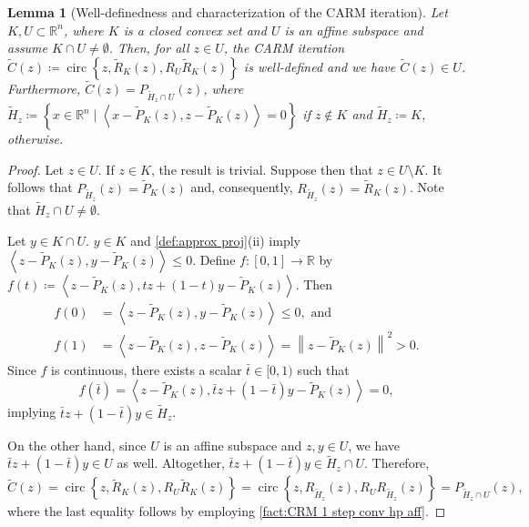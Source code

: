 \documentclass[smallextended,numbook,nospthms]{svjour3}
\theoremstyle{plain}
\newtheorem{lemma}[theorem]{Lemma}
\theoremstyle{definition}
\def\RR{\mathds R}
\newcommand{\scal}[2]{\left\langle{#1},{#2}  \right\rangle}
\DeclareMathOperator{\circum}{circ}
\begin{document}
\begin{lemma}[Well-definedness and characterization of the CARM iteration] \label{lem:CARM well-def char} 
	Let $K, U \subset \RR^{n}$, where $K$ is a closed convex set and $U$ is an affine subspace and assume $K \cap U \not = \emptyset$. Then, for all $z \in U$, the CARM iteration $\tilde{C}(z)\coloneqq \circum\left\{z, \tilde{R}_{K}(z), R_{U}\tilde{R}_{K}(z)\right\}$ is well-defined and we have $\tilde{C}(z) \in U$. Furthermore, $\tilde{C}(z)=P_{\tilde{H}_{z} \cap U}(z)$,
	where $\tilde{H}_{z}\coloneqq \left\{x \in \RR^{n} \mid \scal{x-\tilde{P}_{K}(z)}{z-\tilde{P}_{K}(z)}=0\right\}$ if $z \notin K$ and $\tilde{H}_{z}\coloneqq K$, otherwise.
\end{lemma}
	\begin{proof}

	Let $z \in U$.
	If $z \in K$, the result is trivial. Suppose then that $z \in U \setminus K$. It follows that $P_{\tilde{H}_{z}}(z)=\tilde{P}_{K}(z)$ and, consequently, $R_{\tilde{H}_{z}}(z)=\tilde{R}_{K}(z)$.
	Note that $\tilde{H}_{z} \cap U \neq \emptyset$.
	
	Let $y \in K \cap U$.
	$y \in K$ and \cref{def:approx proj}(ii) imply $\scal{z-\tilde{P}_{K}(z)}{y-\tilde{P}_{K}(z)} \leq 0$.
	Define $f:[0,1] \rightarrow \RR$ by $f(t)\coloneqq \scal{z-\tilde{P}_{K}(z)}{tz+(1-t) y-\tilde{P}_{K}(z)}$.
	Then 
	\begin{align}
			f(0)&=\scal{z-\tilde{P}_{K}(z)}{y-\tilde{P}_{K}(z)} \leq 0, \text{ and}\\
			f(1)&=\scal{z-\tilde{P}_{K}(z)}{z-\tilde{P}_{K}(z)}=\left\|z-\tilde{P}_{K}(z)\right\|^{2}>0.
	\end{align}
	Since $f$ is continuous, there exists a scalar $\bar{t} \in[0,1)$ such that
	\[
	f(\bar{t})=\scal{z-\tilde{P}_{K}(z)}{\bar{t} z+(1-\bar{t}) y-\tilde{P}_{K}(z)}=0,
	\]
	implying $\bar{t} z+(1-\bar{t}) y \in \tilde{H}_{z}$.
	
	On the other hand, since $U$ is an affine subspace and $z, y \in U$, we have $\bar{t}z+(1-\bar{t})y \in U$ as well.
	Altogether, $\bar{t} z+(1-\bar{t}) y \in \tilde{H}_{z} \cap U$.
	Therefore, \[\tilde{C}(z)=\circum\left\{z, \tilde{R}_{K}(z), R_{U}\tilde{R}_{K}(z)\right\}=\circum\left\{z, R_{\tilde{H}_{z}}(z), R_{U}R_{\tilde{H}_{z}}(z)\right\}=P_{\tilde{H}_{z} \cap U}(z),\] where
	the last equality follows by employing  \cref{fact:CRM 1 step conv hp aff}.
\end{proof}
\end{document}
